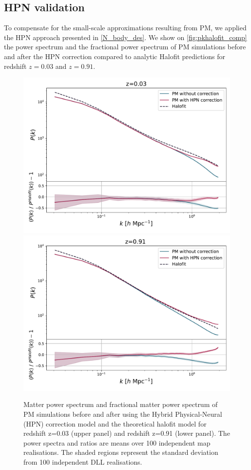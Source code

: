\documentclass{aa}
\begin{document}
\subsection{HPN validation }
To compensate for the small-scale approximations resulting from PM, we applied the HPN approach presented in \autoref{N_body_des}. 
We show on \autoref{fig:pkhalofit_comp} the power spectrum  and the fractional power spectrum of PM simulations before and after the HPN correction compared to analytic Halofit predictions \citep{smith2003stable, takahashi2012revising} for redshift $z=0.03$ and $z=0.91$.
\begin{figure}
    \centering
    \includegraphics[width=\columnwidth]{paper/figures/residual_pk_z0_zoom.pdf}
    \includegraphics[width=\columnwidth]{paper/figures/residual_pk_z1_zoom.pdf}
    \caption{
     Matter power spectrum and fractional matter power spectrum of PM simulations before and after using the Hybrid Physical-Neural (HPN) correction model and the theoretical halofit model for redshift z=0.03 (upper panel) and redshift z=0.91 (lower panel). The power
spectra and ratios are means over 100 independent map realisations. The shaded regions represent the standard deviation from 100 independent DLL realisations.
    }
    \label{fig:pkhalofit_comp}
\end{figure}
\end{document}

